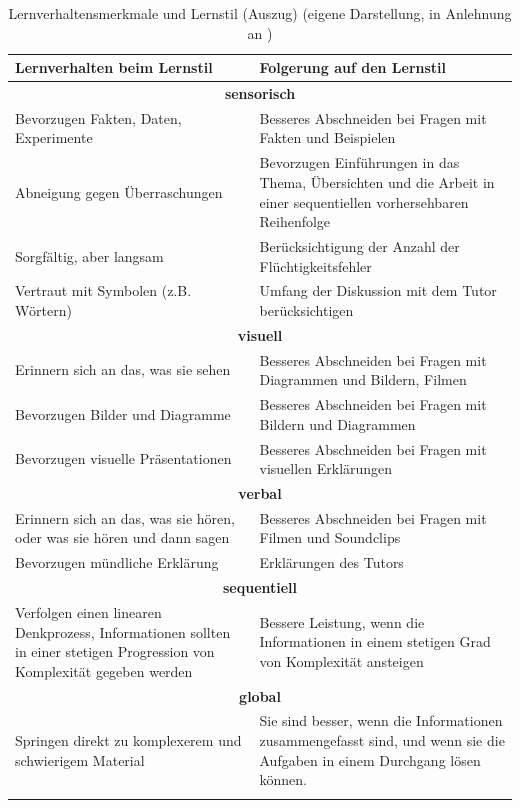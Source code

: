 \begingroup
\footnotesize 
\begin{longtable}{|m{7.5cm}|m{7.5cm}|}
\hline     
\rowcolor[HTML]{EFEFEF}                                         
\centering \textbf{Lernverhalten beim Lernstil} & \centering \arraybackslash \textbf{Folgerung auf den Lernstil} \\ 
\hline  \hline 
\multicolumn{2}{|c|}{\textbf{sensorisch}} \\ \hline \hline 
Bevorzugen Fakten, Daten, Experimente & Besseres Abschneiden bei Fragen mit Fakten und Beispielen  \\ \hline
Abneigung gegen Überraschungen & Bevorzugen Einführungen in das Thema, Übersichten und die Arbeit in einer sequentiellen vorhersehbaren Reihenfolge \\ \hline
Sorgfältig, aber langsam & Berücksichtigung der Anzahl der Flüchtigkeitsfehler \\ \hline
Vertraut mit Symbolen (z.B. Wörtern) & Umfang der Diskussion mit dem Tutor berücksichtigen\\ \hline  \hline 

\multicolumn{2}{|c|}{\textbf{visuell}} \\ \hline \hline 
Erinnern sich an das, was sie sehen & Besseres Abschneiden bei Fragen mit Diagrammen und Bildern, Filmen \\ \hline
Bevorzugen Bilder und Diagramme & Besseres Abschneiden bei Fragen mit Bildern und Diagrammen \\ \hline
Bevorzugen visuelle Präsentationen & Besseres Abschneiden bei Fragen mit visuellen Erklärungen \\ \hline  \hline   
 

\multicolumn{2}{|c|}{\textbf{verbal}} \\ \hline \hline 
Erinnern sich an das, was sie hören, oder was sie hören und dann sagen & Besseres Abschneiden bei Fragen mit Filmen und Soundclips \\ \hline
Bevorzugen mündliche Erklärung  & Erklärungen des Tutors\\ \hline  \hline   

\multicolumn{2}{|c|}{\textbf{sequentiell}} \\ \hline \hline 
Verfolgen einen linearen Denkprozess, Informationen sollten in einer stetigen Progression von Komplexität gegeben werden &
Bessere Leistung, wenn die Informationen in einem stetigen Grad von Komplexität ansteigen \\ \hline \hline   
 

\multicolumn{2}{|c|}{\textbf{global}} \\ \hline \hline 
Springen direkt zu komplexerem und schwierigem Material &
Sie sind besser, wenn die Informationen zusammengefasst sind, und wenn sie die Aufgaben in einem Durchgang lösen können. \\ \hline
\caption[Lernverhaltensmerkmale und Lernstil (Auszug)]{Lernverhaltensmerkmale und Lernstil (Auszug) (eigene Darstellung, in Anlehnung an \parencite[56]{Latham.2011}) } 
\label{tab:/Lernverhaltensmerkmale} 
\end{longtable}
\endgroup
 

